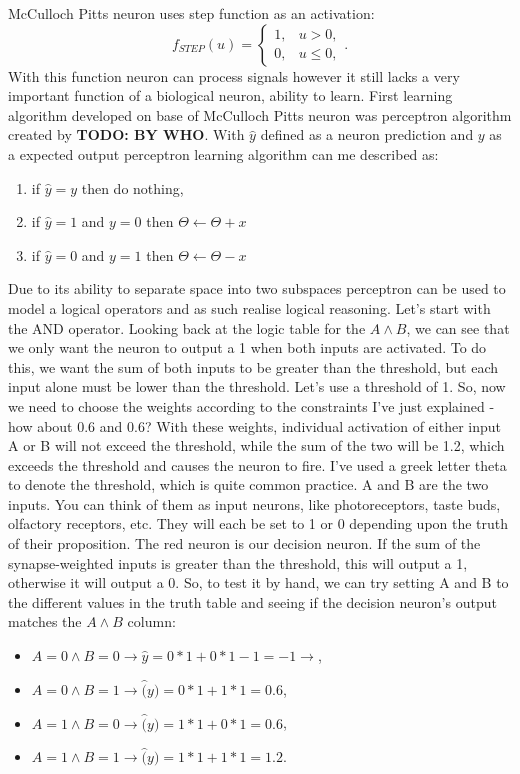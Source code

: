 McCulloch Pitts neuron uses step function as an activation:
\[
	\label{equ:step_function}
	 f_{STEP}(u)=
	\begin{cases}
		1,&  u > 0, \\
		0,&  u \leq 0,
	\end{cases}
	.
\]
With this function neuron can process signals however it still lacks a very important function
of a biological neuron, ability to learn. First learning algorithm developed on base of 
McCulloch Pitts neuron was perceptron algorithm created by \textbf{TODO: BY WHO}.
With $\hat{y}$ defined as a neuron prediction and $y$ as a expected output perceptron learning
algorithm can me described as:
\begin{enumerate}
	\item if $\hat{y}=y$ then do nothing,
	\item if $\hat{y}=1$ and $y=0$ then $\Theta \leftarrow \Theta + x$
	\item if $\hat{y}=0$ and $y=1$ then $\Theta \leftarrow \Theta - x$
\end{enumerate}
Due to its ability to separate space into two subspaces perceptron can be used to model a logical
operators and as such realise logical reasoning.
Let's start with the AND operator.  Looking back at the logic table for the $A\land B$, 
we can see that we only want the neuron to output a 1 when both inputs are activated.
To do this, we want the sum of both inputs to be greater than the threshold, but each input alone
must be lower than the threshold.  Let's use a threshold of 1. 
So, now we need to choose the weights according to the constraints I've just explained - 
how about 0.6 and 0.6?  With these weights, individual activation of either input A or B will 
not exceed the threshold, while the sum of the two will be 1.2, which exceeds the threshold 
and causes the neuron to fire.
I've used a greek letter theta to denote the threshold, which is quite common practice. 
A and B are the two inputs.  You can think of them as input neurons, like photoreceptors, 
taste buds, olfactory receptors, etc.  They will each be set to 1 or 0 depending upon the truth of
their proposition.  The red neuron is our decision neuron. 
If the sum of the synapse-weighted inputs is greater than the threshold, 
this will output a 1, otherwise it will output a 0.  
So, to test it by hand, we can try setting A and B to the different values in the 
truth table and seeing if the decision neuron's output matches the $A\land B$ column:
\begin{itemize}
	\item  $A=0 \land B=0  \to   \hat{y} = 0*1  +  0*1 - 1  = -1 \to$,
	\item $A=0 \land B=1  \to  \hat(y) = 0*1  +  1*1  = 0.6$,
	\item $A=1 \land B=0  \to  \hat(y) = 1*1  +  0*1  = 0.6$,
	\item $A=1 \land B=1  \to  \hat(y) = 1*1  +  1*1  = 1.2$.
\end{itemize}

